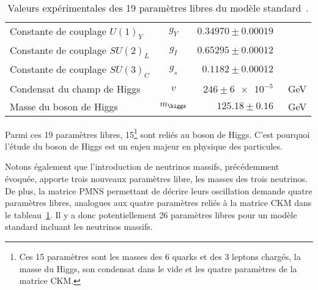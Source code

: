\begin{table}[h]
\begin{tabular}{lcrl}
Constante de couplage $U(1)_Y$ & $g_Y$ & $\num{0.34970}\pm\num{0.00019}$ & \\
Constante de couplage $SU(2)_L$ & $g_I$ & $\num{0.65295}\pm\num{0.00012}$ & \\
Constante de couplage $SU(3)_C$ & $g_s$ & $\num{0.1182}\pm\num{0.00012}$ & \\
Condensat du champ de Higgs & $v$ & $\num{246}\pm\num{6e-5}$ & \SI{}{\GeV} \\
Masse du boson de Higgs & $m_{\higgs}$ & $\num{125.18}\pm\num{0.16}$ & \SI{}{\GeV} \\
\bottomrule
\end{tabular}
\caption{Valeurs expérimentales des 19 paramètres libres du modèle standard~\cite{PDG_booklet_2018}.}
\label{tab-19_free_SM_parameters}
\end{table}
Parmi ces 19 paramètres libres, 15\footnote{Ces 15 paramètres sont les masses des 6 quarks et des 3 leptons chargés, la masse du Higgs, son condensat dans le vide et les quatre paramètres de la matrice CKM.} sont reliés au boson de Higgs. C'est pourquoi l'étude du boson de Higgs est un enjeu majeur en physique des particules.
\par Notons également que l'introduction de neutrinos massifs, précédemment évoquée, apporte trois nouveaux paramètres libre, les masses des trois neutrinos. De plus, la matrice PMNS permettant de décrire leurs oscillation demande quatre paramètres libres, analogues aux quatre paramètres reliés à la matrice CKM dans le tableau~\ref{tab-19_free_SM_parameters}. Il y a donc potentiellement 26 paramètres libres pour un modèle standard incluant les neutrinos massifs.
